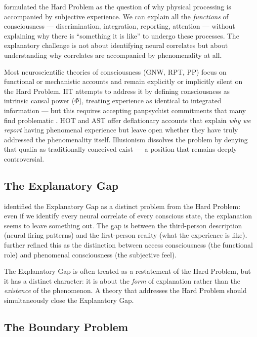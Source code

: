 \documentclass[12pt]{article}
\begin{document}
\citet{Chalmers1995,Chalmers1996} formulated the Hard Problem as the question of why physical processing is accompanied by subjective experience. We can explain all the \emph{functions} of consciousness --- discrimination, integration, reporting, attention --- without explaining why there is ``something it is like'' \citep{Nagel1974} to undergo these processes. The explanatory challenge is not about identifying neural correlates but about understanding why correlates are accompanied by phenomenality at all.

Most neuroscientific theories of consciousness (GNW, RPT, PP) focus on functional or mechanistic accounts and remain explicitly or implicitly silent on the Hard Problem. IIT attempts to address it by defining consciousness as intrinsic causal power ($\Phi$), treating experience as identical to integrated information --- but this requires accepting panpsychist commitments that many find problematic \citep{Aaronson2014,Doerig2019}. HOT and AST offer deflationary accounts that explain \emph{why we report} having phenomenal experience but leave open whether they have truly addressed the phenomenality itself. Illusionism \citep{Dennett1991,Frankish2016} dissolves the problem by denying that qualia as traditionally conceived exist --- a position that remains deeply controversial.


\subsection{The Explanatory Gap}


\citet{Levine1983} identified the Explanatory Gap as a distinct problem from the Hard Problem: even if we identify every neural correlate of every conscious state, the explanation seems to leave something out. The gap is between the third-person description (neural firing patterns) and the first-person reality (what the experience is like). \citet{Block1995,Block2007} further refined this as the distinction between access consciousness (the functional role) and phenomenal consciousness (the subjective feel).

The Explanatory Gap is often treated as a restatement of the Hard Problem, but it has a distinct character: it is about the \emph{form} of explanation rather than the \emph{existence} of the phenomenon. A theory that addresses the Hard Problem should simultaneously close the Explanatory Gap.


\subsection{The Boundary Problem}
\end{document}
